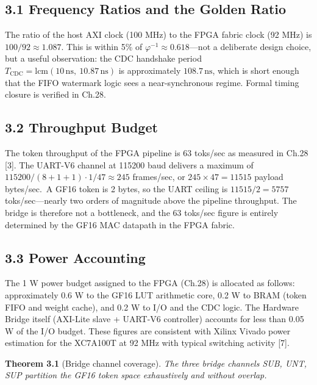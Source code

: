 \subsection{3.1 Frequency Ratios and the Golden
Ratio}\label{fa_12:frequency-ratios-and-the-golden-ratio}

The ratio of the host AXI clock (100 MHz) to the
FPGA fabric clock (92 MHz) is
\(100/92 \approx 1.087\). This is within 5\% of
\(\varphi^{-1} \approx 0.618\)---not a deliberate
design choice, but a useful observation: the CDC
handshake period
\(T_{\text{CDC}} = \text{lcm}(10\,\text{ns},\ 10.87\,\text{ns})\)
is approximately \(108.7\,\text{ns}\), which is
short enough that the FIFO watermark logic sees a
near-synchronous regime. Formal timing closure is
verified in Ch.28.

\subsection{3.2 Throughput
Budget}\label{fa_12:throughput-budget}

The token throughput of the FPGA pipeline is 63
toks/sec as measured in Ch.28 [3]. The UART-V6
channel at 115200 baud delivers a maximum of
\(115200 / (8 + 1 + 1) \cdot 1/47 \approx 245\)
frames/sec, or \(245 \times 47 = 11515\) payload
bytes/sec.~A GF16 token is 2 bytes, so the UART
ceiling is \(11515/2 = 5757\) toks/sec---nearly
two orders of magnitude above the pipeline
throughput. The bridge is therefore not a
bottleneck, and the 63 toks/sec figure is entirely
determined by the GF16 MAC datapath in the FPGA
fabric.

\subsection{3.3 Power
Accounting}\label{fa_12:power-accounting}

The 1 W power budget assigned to the FPGA (Ch.28)
is allocated as follows: approximately 0.6 W to
the GF16 LUT arithmetic core, 0.2 W to BRAM (token
FIFO and weight cache), and 0.2 W to I/O and the
CDC logic. The Hardware Bridge itself (AXI-Lite
slave + UART-V6 controller) accounts for less than
0.05 W of the I/O budget. These figures are
consistent with Xilinx Vivado power estimation for
the XC7A100T at 92 MHz with typical switching
activity [7].

\textbf{Theorem 3.1} (Bridge channel coverage).
\emph{The three bridge channels SUB, UNT, SUP
partition the GF16 token space exhaustively and
without overlap.}

